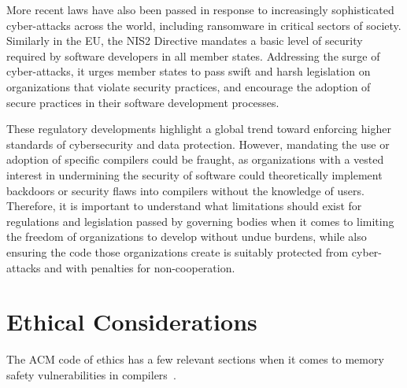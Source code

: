 \documentclass[sigconf, anonymous]{acmart}
\begin{document}
More recent laws have also been passed in response to increasingly sophisticated cyber-attacks across the world, including ransomware in critical sectors of society. Similarly in the EU, the NIS2 Directive mandates a basic level of security required by software developers in all member states\cite{nis2024}. Addressing the surge of cyber-attacks, it urges member states to pass swift and harsh legislation on organizations that violate security practices, and encourage the adoption of secure practices in their software development processes.

These regulatory developments highlight a global trend toward enforcing higher standards of cybersecurity and data protection. However, mandating the use or adoption of specific compilers could be fraught, as organizations with a vested interest in undermining the security of software could theoretically implement backdoors or security flaws into compilers without the knowledge of users. Therefore, it is important to understand what limitations should exist for regulations and legislation passed by governing bodies when it comes to limiting the freedom of organizations to develop without undue burdens, while also ensuring the code those organizations create is suitably protected from cyber-attacks and with penalties for non-cooperation.


\section{Ethical Considerations}
\label{ethical considerations}

The ACM code of ethics has a few relevant sections when it comes to memory safety vulnerabilities in compilers~\cite{ACMCODE}.
\end{document}

